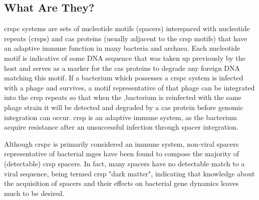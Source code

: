 \documentclass[12pt,letter]{article}
\begin{document}
\subsection{What Are They?}
\ac{crspc} systems are sets of nucleotide motifs (spacers) interspaced with nucleotide repeats (\ac{crsp}s) and \ac{cas} proteins (usually adjacent to the \ac{crsp} motifs) that have an adaptive immune function in many bacteria and archaea\citep{crispgen}.
Each nucleotide motif is indicative of some DNA sequence that was taken up previously by the host and serves as a marker for the \ac{cas} proteins to degrade any foreign DNA matching this motif\citep{crispgen}.
If a bacterium which possesses a \ac{crspc} system is infected with a phage and survives, a motif representative of that phage can be integrated into the \ac{crsp} repeats so that when the ,bacterium is reinfected with the same phage strain it will be detected and degraded by a \ac{cas} protein before genomic integration can occur.
\ac{crsp} is an adaptive immune system, as the bacterium acquire resistance after an unsuccessful infection through spacer integration.\par
Although \ac{crspc} is primarily considered an immune system, non-viral spacers representative of bacterial \ac{mge}s have been found to compose the majority of (detectable) \ac{crsp} spacers\citep{nonvspacer}.
In fact, many spacers have no detectable match to a viral sequence, being termed \ac{crsp} "dark matter", indicating that knowledge about the acquisition of spacers and their effects on bacterial gene dynamics leaves much to be desired\citep{nonvspacer}.
\end{document}
